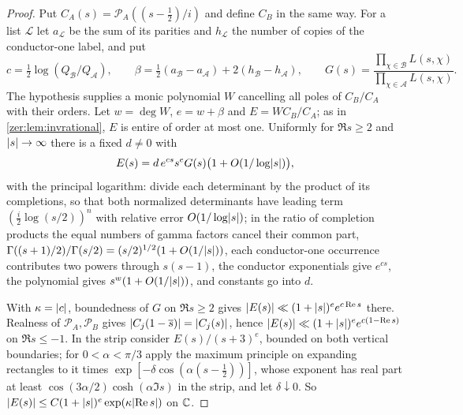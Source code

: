 \begin{proof}
Put $C_A(s)=\mathcal P_A((s-\tfrac12)/i)$ and define $C_B$ in the same way. For a list $\mathcal L$ let
$a_{\mathcal L}$ be the sum of its parities and $h_{\mathcal L}$ the number of copies of the conductor-one
label, and put
\[
 c=\tfrac12\log(Q_{\mathcal B}/Q_{\mathcal A}),\qquad\beta=\tfrac12(a_{\mathcal B}-a_{\mathcal A})+2(h_{\mathcal B}-h_{\mathcal A}),\qquad
 G(s)=\frac{\prod_{\chi\in\mathcal B}L(s,\chi)}{\prod_{\chi\in\mathcal A}L(s,\chi)} .
\]
The hypothesis supplies a monic polynomial $W$ cancelling all poles of $C_B/C_A$ with their orders. Let
$w=\deg W$, $e=w+\beta$ and $E=WC_B/C_A$; as in \cref{zer:lem:invrational}, $E$ is entire of order at most
one. Uniformly for $\Re s\ge2$ and $\lvert s\rvert\to\infty$ there is a fixed $d\ne0$ with
\begin{equation}\label{zer:eq:blindasym}
 E(s)=d\,e^{cs}s^eG(s)\bigl(1+O(1/\log\lvert s\rvert)\bigr),
\end{equation}
with the principal logarithm: divide each determinant by the product of its completions, so that both
normalized determinants have leading term $(\tfrac i2\log(s/2))^n$ with relative error $O(1/\log\lvert s\rvert)$;
in the ratio of completion products the equal numbers of gamma factors cancel their common part,
$\Gamma((s+1)/2)/\Gamma(s/2)=(s/2)^{1/2}(1+O(1/\lvert s\rvert))$, each conductor-one occurrence contributes two
powers through $s(s-1)$, the conductor exponentials give $e^{cs}$, the polynomial gives
$s^w(1+O(1/\lvert s\rvert))$, and constants go into $d$.

With $\kappa=\lvert c\rvert$, boundedness of $G$ on $\Re s\ge2$ gives $\lvert E(s)\rvert\ll(1+\lvert s\rvert)^ee^{c\operatorname{Re} s}$ there.
Realness of $\mathcal P_A,\mathcal P_B$ gives $\lvert C_j(1-\overline s)\rvert=\lvert C_j(s)\rvert$, hence
$\lvert E(s)\rvert\ll(1+\lvert s\rvert)^ee^{c(1-\operatorname{Re} s)}$ on $\Re s\le-1$. In the strip consider $E(s)/(s+3)^e$, bounded on
both vertical boundaries; for $0<\alpha<\pi/3$ apply the maximum principle on expanding rectangles to it
times $\exp[-\delta\cos(\alpha(s-\tfrac12))]$, whose exponent has real part at least
$\cos(3\alpha/2)\cosh(\alpha\Im s)$ in the strip, and let $\delta\downarrow0$. So
$\lvert E(s)\rvert\le C(1+\lvert s\rvert)^e\exp(\kappa\lvert\operatorname{Re} s\rvert)$ on $\mathbb{C}$.


\end{proof}
